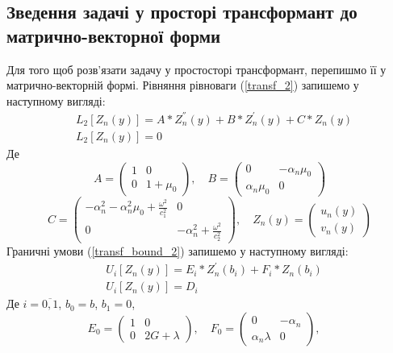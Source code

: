 \subsection{Зведення задачі у просторі трансформант до матрично-векторної форми}
Для того щоб розв'язати задачу у простосторі трансформант, перепишмо її у матрично-векторній формі.
Рівняння рівноваги (\ref{transf_2}) запишемо у наступному вигляді:
\begin{align}\label{transf_mat_2}
    &L_2\left[ Z_n(y) \right] = A * Z_n^{''}(y) + B * Z_n^{'}(y) + C * Z_n(y) \nonumber \\
    & L_2\left[ Z_n(y) \right] = 0
\end{align}
Де
\begin{equation*}
    A = \begin{pmatrix}
        1 & 0 \\
        0 & 1 + \mu_0
    \end{pmatrix}, \quad
    B = \begin{pmatrix}
        0 & -\alpha_n \mu_0 \\
        \alpha_n \mu_0 & 0
    \end{pmatrix}
\end{equation*}
\begin{equation*}
    C = \begin{pmatrix}
        -\alpha_n^2 -\alpha_n^2 \mu_0 + \frac{\omega^2}{c_1^2} & 0 \\
        0 & -\alpha_n^2 + \frac{\omega^2}{c_2^2}
    \end{pmatrix}, \quad
    Z_n(y) = \begin{pmatrix}
        u_n(y) \\
        v_n(y)
    \end{pmatrix}
\end{equation*}
Граничні умови (\ref{transf_bound_2}) запишемо у наступному вигляді:
\begin{align}\label{transf_bound_mat_2}
    &U_i\left[ Z_n(y) \right] = E_i * Z_n^{'}(b_i) + F_i * Z_n(b_i) \nonumber \\
    & U_i\left[ Z_n(y) \right] = D_i
\end{align}
Де $i = \overline{0, 1}$, $b_0 = b$, $b_1 = 0$,
\begin{equation*}
    E_0 = \begin{pmatrix}
        1 & 0 \\
        0 & 2G + \lambda
    \end{pmatrix}, \quad
    F_0 = \begin{pmatrix}
        0 & -\alpha_n \\
        \alpha_n \lambda & 0
    \end{pmatrix}, \quad
\end{equation*}

